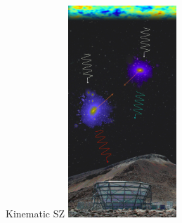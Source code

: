 \documentclass[table]{beamer}
\begin{document}
\begin{frame}{Kinematic SZ}
	\includegraphics[height=8cm]{sz_act_boss_sudeep.jpeg}
\end{frame}
\end{document}
